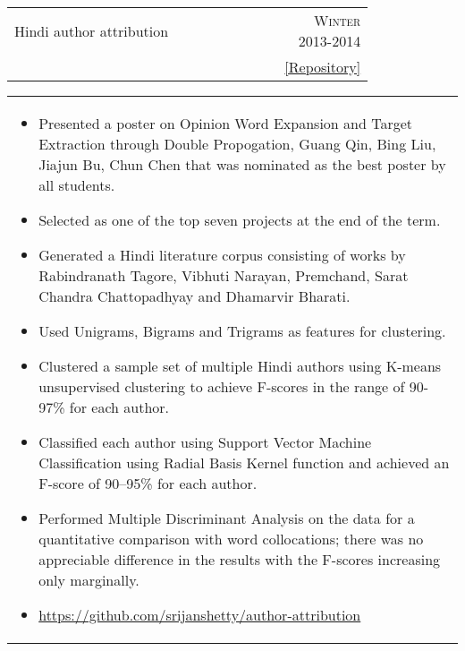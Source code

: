 \documentclass[a4paper,10pt]{article} %
\newcommand{\cproject}[5]{
    \begin{tabular}{p{0.80\linewidth}r}
        \textcolor{NavyBlue}{#2} & \multicolumn{1}{m{4cm}}{\raggedleft \textsc{#1}}\\
        #3 & #4
    \end{tabular}
    \begin{tabular}{p{\linewidth}}
    \vspace{-0.3cm}
        \footnotesize{#5}
    \end{tabular}
    \vspace{-0.5cm}
}
\begin{document}
\cproject
    {Winter 2013-2014}
    {Hindi author attribution}
    {\textsc{\raggedright Artificial Intelligence}, Professor Amitabha Mukherjee}
    { \href{https://github.com/srijanshetty/author-attribution}{ \footnotesize{[Repository]}} }
          {
             \begin{itemize}[leftmargin=0.5cm]
                 \item Presented a poster on Opinion Word Expansion and Target Extraction through Double Propogation, Guang Qin,
                     Bing Liu, Jiajun Bu, Chun Chen that was nominated as the best poster by all students.
                 \item Selected as one of the top seven projects at the end of the term.
                 \item Generated a Hindi literature corpus consisting of works by Rabindranath Tagore,
                     Vibhuti Narayan, Premchand, Sarat Chandra Chattopadhyay and Dhamarvir Bharati.
                 \item Used Unigrams, Bigrams and Trigrams as features for clustering.
                 \item Clustered a sample set of multiple Hindi authors using K-means unsupervised clustering to achieve
                     F-scores in the range of 90-97\% for each author.
                 \item Classified each author using Support Vector Machine Classification using Radial Basis Kernel function
                     and achieved an F-score of 90--95\% for each author.
                 \item Performed Multiple Discriminant Analysis on the data for a quantitative comparison with word
                     collocations; there was no appreciable difference in the results with the F-scores increasing only
                     marginally.
                 \item \href{https://github.com/srijanshetty/author-attribution}{https://github.com/srijanshetty/author-attribution}
             \end{itemize}
         }
\end{document}
